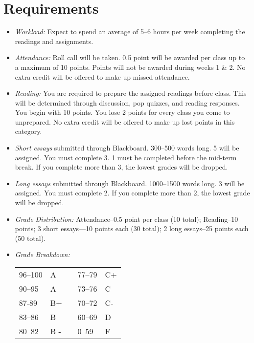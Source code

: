 \documentclass[article,oneside]{memoir}
\begin{document}
\section{Requirements}

\begin{itemize}
\item \textit{Workload:} Expect to spend an average of 5--6 hours per week  completing the readings and assignments.

\item \textit{Attendance:} Roll call will be taken. 0.5 point will be awarded per class up to a maximum of 10 points. Points will not be awarded during weeks 1 \& 2. No extra credit will be offered to make up missed attendance.
\item \textit{Reading:} You are required to prepare the assigned readings before class. This will be determined through discussion, pop quizzes, and reading responses. You begin with 10 points. You lose 2 points for every class you come to unprepared. No extra credit will be offered to make up lost points in this category. 

\item \textit{Short essays} submitted through Blackboard. 300--500 words long. 5 will be assigned. You must complete 3. 1 must be completed before the mid-term break. If you complete more than 3, the lowest grades will be dropped.

 
\item \textit{Long essays} submitted through Blackboard. 1000--1500 words long. 3 will be assigned. You must complete 2. If you complete more than 2, the lowest grade will be dropped.


\item \textit{Grade Distribution:} Attendance--0.5 point per class (10 total); Reading--10 points; 3 short essays---10 points each (30 total); 2 long essays--25 points each (50 total).

\item \textit{Grade Breakdown:}

 \begin{tabular}{ | l | l | p{2cm} | l | l | }
    \hline 
96--100 & A  & &  77--79 &  C+ \\  
90--95 & A- & &  73--76 & C \\
87-89 & B+ &  &  70--72 & C- \\ 
83--86 & B  & &  60--69 & D\\
80--82 & B - & & 0--59 & F\\ \hline
    \end{tabular}


\end{itemize}
\end{document}
